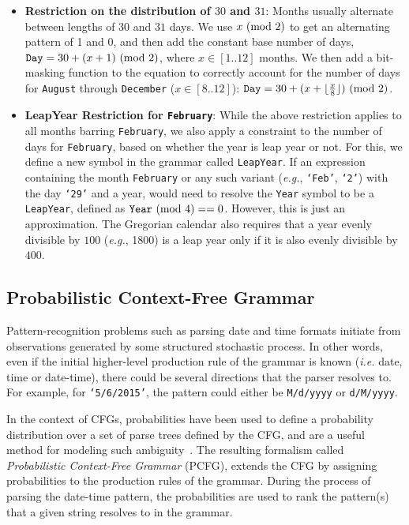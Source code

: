 \begin{itemize}
\setlength\itemsep{0em}
\item \textbf{Restriction on the distribution of $30$ and $31$}:
Months usually alternate between lengths of $30$ and $31$ days. We use $x \ (\text{mod}\ 2)$ to get an alternating pattern of 1 and 0, and then add the constant base number of days, $\texttt{Day} = 30 + (x + 1) \ (\text{mod}\ 2)$, where $x \in [1..12]$ months. We then add a bit-masking function to the equation to correctly account for the number of days for \texttt{August} through \texttt{December} ($x \in [8..12]$): $\texttt{Day} = 30 + (x + \lfloor\frac{x}{8}\rfloor) \ (\text{mod}\ 2)$.


\item \textbf{LeapYear Restriction for \texttt{February}}:
While the above restriction applies to all months barring \texttt{February}, we also apply a constraint to the number of days for \texttt{February}, based on whether the year is leap year or not. For this, we define a new symbol in the grammar called \texttt{LeapYear}. If an expression containing the month \texttt{February} or any such variant (\textit{e.g.}, \texttt{`Feb'}, \texttt{`2'}) with the day \texttt{`29'} and a year, would need to resolve the \texttt{Year} symbol to be a \texttt{LeapYear}, defined as $\texttt{Year} \ (\text{mod}\ 4) == 0$. However, this is just an approximation. The Gregorian calendar also requires that a year evenly divisible by $100$ (\textit{e.g.}, 1800) is a leap year only if it is also evenly divisible by $400$. 

\end{itemize}


\subsection{Probabilistic Context-Free Grammar}

Pattern-recognition problems such as parsing date and time formats initiate from observations generated by some structured stochastic process. In other words, even if the initial higher-level production rule of the grammar is known (\textit{i.e.} date, time or date-time), there could be several directions that the parser resolves to. For example, for \texttt{`5/6/2015'}, the pattern could either be \texttt{M/d/yyyy} or \texttt{d/M/yyyy}. 

In the context of CFGs, probabilities have been used to define a probability distribution over a set of parse trees defined by the CFG, and are a useful method for modeling such ambiguity~\cite{Collins:2003,Manning:1999}. The resulting formalism called \textit{Probabilistic Context-Free Grammar} (PCFG), extends the CFG by assigning probabilities to the production rules of the grammar. During the process of parsing the date-time pattern, the probabilities are used to rank the pattern(s) that a given string resolves to in the grammar. 


